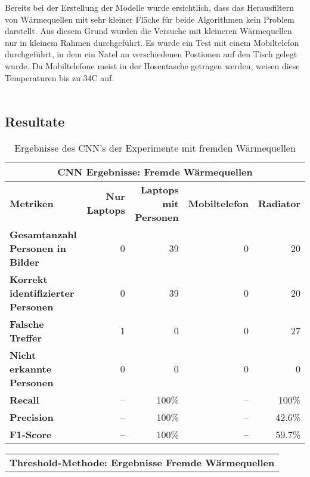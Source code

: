 \noindent
Bereits bei der Erstellung der Modelle wurde ersichtlich, dass das Herausfiltern von Wärmequellen mit sehr kleiner Fläche für beide Algorithmen kein Problem darstellt. Aus diesem Grund wurden die Versuche mit kleineren Wärmequellen nur in kleinem Rahmen durchgeführt. Es wurde ein Test mit einem Mobiltelefon durchgeführt, in dem ein Natel an verschiedenen Postionen auf den Tisch gelegt wurde. Da Mobiltelefone meist in der Hosentasche getragen werden, weisen diese Temperaturen bis zu 34\degree C auf.\\
\\

\subsection{Resultate}

{
	\renewcommand{\arraystretch}{1.3}
	\begin{table}[H]
		\centering
		\scriptsize
		\begin{tabularx}{.9\textwidth}{Xrrrr}
			\hline
			\multicolumn{5}{c}{\textbf{\gls{CNN} Ergebnisse: Fremde Wärmequellen}}\\
			\hline
			\textbf{Metriken} & \textbf{Nur Laptops} & \textbf{Laptops mit Personen} & \textbf{Mobiltelefon} & \textbf{Radiator}\\
			\hline 
			\textbf{Gesamtanzahl Personen in Bilder} & 0 & 39 & 0 & 20\\
			\hline
			\textbf{Korrekt identifizierter Personen} & 0 & 39 & 0 & 20\\
			\hline
			\textbf{Falsche Treffer} & 1 & 0 & 0 & 27\\
			\hline
			\textbf{Nicht erkannte Personen} & 0 & 0 & 0 & 0\\
			\hline
			\textbf{Recall} & -- & 100\% & -- & 100\%\\
			\hline  
			\textbf{Precision} & -- & 100\% & -- & 42.6\%\\
			\hline
			\textbf{F1-Score} & -- & 100\% & -- & 59.7\%\\
			\hline
		\end{tabularx}
		\caption{Ergebnisse des \gls{CNN}'s der Experimente mit fremden Wärmequellen}
		\label{tbl:heatSourcesCNN}
	\end{table}
	\begin{table}[H]
		\centering
		\scriptsize
		\begin{tabularx}{.9\textwidth}{Xrrrr}
			\hline
			\multicolumn{5}{c}{\textbf{Threshold-Methode: Ergebnisse Fremde Wärmequellen}}\\

\end{tabularx}
\end{table}}
